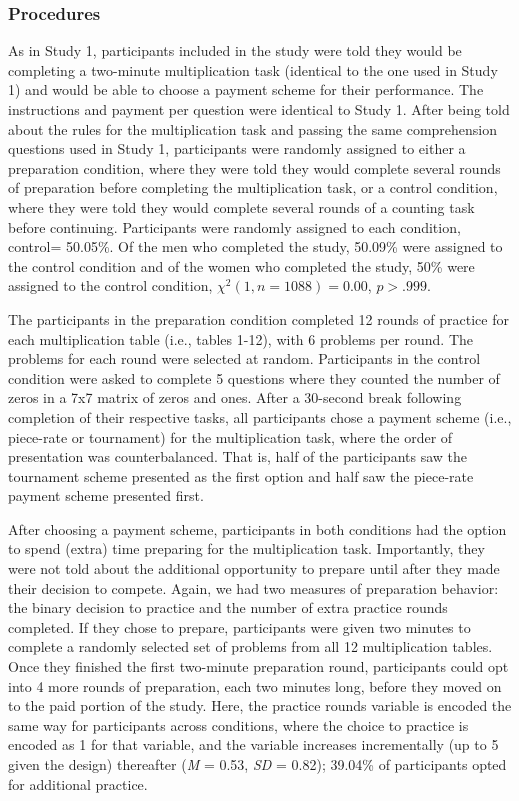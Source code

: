 \documentclass[a4paper, nobind]{templates/ociamthesis}
\begin{document}
\hypertarget{procedures-1}{%
\subsubsection{Procedures}\label{procedures-1}}

As in Study 1, participants included in the study were told they would be completing a two-minute multiplication task (identical to the one used in Study 1) and would be able to choose a payment scheme for their performance. The instructions and payment per question were identical to Study 1. After being told about the rules for the multiplication task and passing the same comprehension questions used in Study 1, participants were randomly assigned to either a preparation condition, where they were told they would complete several rounds of preparation before completing the multiplication task, or a control condition, where they were told they would complete several rounds of a counting task before continuing. Participants were randomly assigned to each condition, control= 50.05\%. Of the men who completed the study, 50.09\% were assigned to the control condition and of the women who completed the study, 50\% were assigned to the control condition, \(\chi^2(1, n = 1088) = 0.00\), \(p > .999\).

The participants in the preparation condition completed 12 rounds of practice for each multiplication table (i.e., tables 1-12), with 6 problems per round. The problems for each round were selected at random. Participants in the control condition were asked to complete 5 questions where they counted the number of zeros in a 7x7 matrix of zeros and ones. After a 30-second break following completion of their respective tasks, all participants chose a payment scheme (i.e., piece-rate or tournament) for the multiplication task, where the order of presentation was counterbalanced. That is, half of the participants saw the tournament scheme presented as the first option and half saw the piece-rate payment scheme presented first.

After choosing a payment scheme, participants in both conditions had the option to spend (extra) time preparing for the multiplication task. Importantly, they were not told about the additional opportunity to prepare until after they made their decision to compete. Again, we had two measures of preparation behavior: the binary decision to practice and the number of extra practice rounds completed. If they chose to prepare, participants were given two minutes to complete a randomly selected set of problems from all 12 multiplication tables. Once they finished the first two-minute preparation round, participants could opt into 4 more rounds of preparation, each two minutes long, before they moved on to the paid portion of the study. Here, the practice rounds variable is encoded the same way for participants across conditions, where the choice to practice is encoded as 1 for that variable, and the variable increases incrementally (up to 5 given the design) thereafter (\emph{M} = 0.53, \emph{SD} = 0.82); 39.04\% of participants opted for additional practice.
\end{document}
